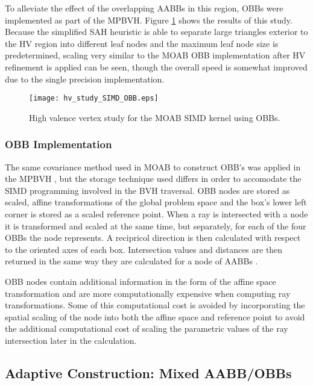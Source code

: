 To alleviate the effect of the overlapping AABBs in this region, OBBs were
implemented as part of the MPBVH. Figure \ref{fig:hv_study_simd_obbs} shows the
results of this study. Because the simplified SAH heuristic is able to separate
large triangles exterior to the HV region into different leaf nodes and the
maximum leaf node size is predetermined, scaling very similar to the MOAB OBB
implementation after HV refinement is applied can be seen, though the overall
speed is somewhat improved due to the single precision implementation.

\begin{figure}
  \texttt{[image: hv\_study\_SIMD\_OBB.eps]}
  \caption{High valence vertex study for the MOAB SIMD kernel using OBBs.}
  \label{fig:hv_study_simd_obbs}
\end{figure}

\subsubsection{OBB Implementation}

The same covariance method used in MOAB to construct OBB's was applied in the
MPBVH \cite{Weghorst_1984}, but the storage technique used differs in order to
accomodate the SIMD programming involved in the BVH traversal. OBB nodes are
stored as scaled, affine transformations of the global problem space and the
box's lower left corner is stored as a scaled reference point. When a ray is
intersected with a node it is transformed and scaled at the same time, but
separately, for each of the four OBBs the node represents. A recipricol
direction is then calculated with respect to the oriented axes of each
box. Intersection values and distances are then returned in the same way they
are calculated for a node of AABBs \cite{Wald_2014}.

OBB nodes contain additional information in the form of the affine space
transformation and are more computationally expensive when computing ray
transformations. Some of this computational cost is avoided by incorporating the
spatial scaling of the node into both the affine space and reference point to
avoid the additional computational cost of scaling the parametric values of the
ray intersection later in the calculation.

\subsection{Adaptive Construction: Mixed AABB/OBBs}

